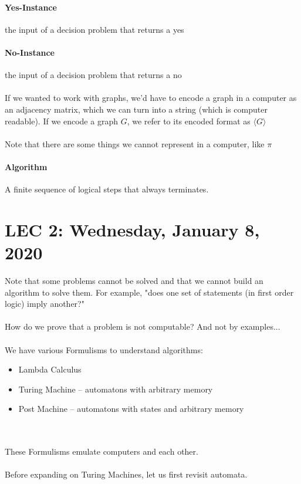 \documentclass[12pt]{article}
\begin{document}
\paragraph{Yes-Instance} the input of a decision problem that returns a yes

\paragraph{No-Instance} the input of a decision problem that returns a no
\\
\\
If we wanted to work with graphs, we'd have to encode a graph in a computer as an adjacency matrix, which we can turn into a string (which is computer readable). If we encode a graph $G$, we refer to its encoded format as $\langle G \rangle$
\\
\\
Note that there are some things we cannot represent in a computer, like $\pi$

\paragraph{Algorithm} A finite sequence of logical steps that always terminates.

\section{LEC 2: Wednesday, January 8, 2020}

Note that some problems cannot be solved and that we cannot build an algorithm to solve them. For example, "does one set of statements (in first order logic) imply another?"
\\
\\
How do we prove that a problem is not computable? And not by examples...
\\
\\
We have various Formulisms to understand algorithms:
\begin{itemize}
    \item Lambda Calculus
    \item Turing Machine -- automatons with arbitrary memory
    \item Post Machine --  automatons with states and arbitrary memory
\end{itemize}
\\
\\
These Formulisms emulate computers and each other.
\\
\\
Before expanding on Turing Machines, let us first revisit automata.
\end{document}
